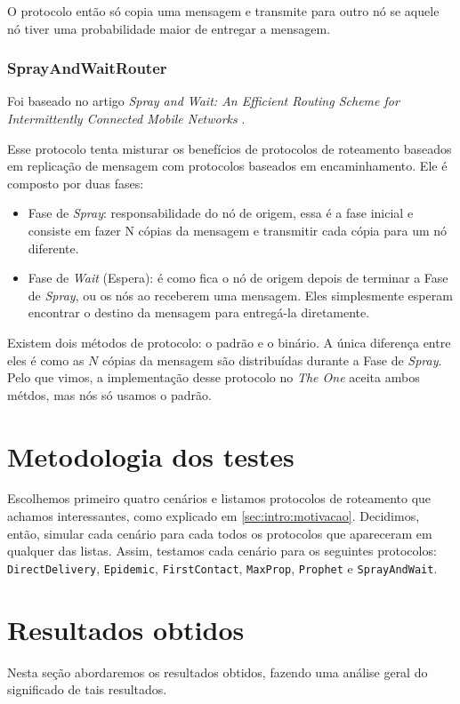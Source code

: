 \documentclass[conference]{IEEEtran}
\begin{document}
O protocolo então só copia uma mensagem e transmite para outro nó se aquele nó tiver uma probabilidade maior de entregar a mensagem.

\subsubsection{SprayAndWaitRouter}
Foi baseado no artigo \textit{Spray and Wait: An Efficient Routing Scheme for Intermittently Connected Mobile Networks} \cite{SprayAndWaitRouter:original}.

Esse protocolo tenta misturar os benefícios de protocolos de roteamento baseados em replicação de mensagem com protocolos baseados em encaminhamento. Ele é composto por duas fases:
\begin{itemize}
  \item Fase de \textit{Spray}: responsabilidade do nó de origem, essa é a fase inicial e consiste em fazer N cópias da mensagem e transmitir cada cópia para um nó diferente.
  \item Fase de \textit{Wait} (Espera): é como fica o nó de origem depois de terminar a Fase de \textit{Spray}, ou os nós ao receberem uma mensagem. Eles simplesmente esperam encontrar o destino da mensagem para entregá-la diretamente.
\end{itemize}

Existem dois métodos de protocolo: o padrão e o binário. A única diferença entre eles é como as $N$ cópias da mensagem são distribuídas durante a Fase de \textit{Spray}. Pelo que vimos, a implementação desse protocolo no \emph{The One} aceita ambos métdos, mas nós só usamos o padrão.

\section{Metodologia dos testes}
Escolhemos primeiro quatro cenários e listamos protocolos de roteamento que achamos interessantes, como explicado em \ref{sec:intro:motivacao}. Decidimos, então, simular cada cenário para cada todos os protocolos que apareceram em qualquer das listas. Assim, testamos cada cenário para os seguintes protocolos: \texttt{DirectDelivery}, \texttt{Epidemic}, \texttt{FirstContact}, \texttt{MaxProp}, \texttt{Prophet} e \texttt{SprayAndWait}.


\section{Resultados obtidos}
Nesta seção abordaremos os resultados obtidos, fazendo uma análise geral do significado de tais resultados. 
\end{document}
